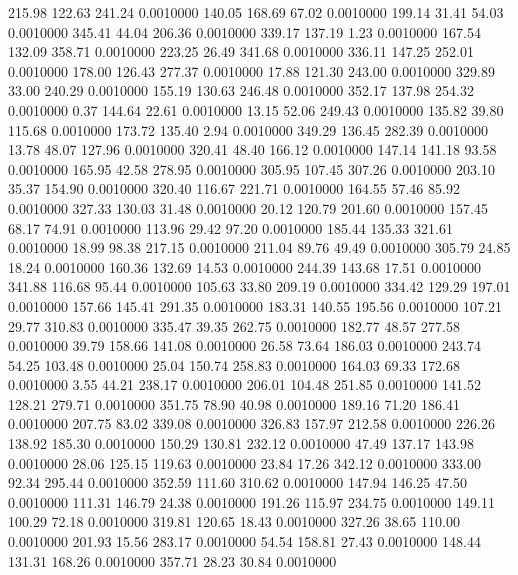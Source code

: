  215.98  122.63  241.24   0.0010000
 140.05  168.69   67.02   0.0010000
 199.14   31.41   54.03   0.0010000
 345.41   44.04  206.36   0.0010000
 339.17  137.19    1.23   0.0010000
 167.54  132.09  358.71   0.0010000
 223.25   26.49  341.68   0.0010000
 336.11  147.25  252.01   0.0010000
 178.00  126.43  277.37   0.0010000
  17.88  121.30  243.00   0.0010000
 329.89   33.00  240.29   0.0010000
 155.19  130.63  246.48   0.0010000
 352.17  137.98  254.32   0.0010000
   0.37  144.64   22.61   0.0010000
  13.15   52.06  249.43   0.0010000
 135.82   39.80  115.68   0.0010000
 173.72  135.40    2.94   0.0010000
 349.29  136.45  282.39   0.0010000
  13.78   48.07  127.96   0.0010000
 320.41   48.40  166.12   0.0010000
 147.14  141.18   93.58   0.0010000
 165.95   42.58  278.95   0.0010000
 305.95  107.45  307.26   0.0010000
 203.10   35.37  154.90   0.0010000
 320.40  116.67  221.71   0.0010000
 164.55   57.46   85.92   0.0010000
 327.33  130.03   31.48   0.0010000
  20.12  120.79  201.60   0.0010000
 157.45   68.17   74.91   0.0010000
 113.96   29.42   97.20   0.0010000
 185.44  135.33  321.61   0.0010000
  18.99   98.38  217.15   0.0010000
 211.04   89.76   49.49   0.0010000
 305.79   24.85   18.24   0.0010000
 160.36  132.69   14.53   0.0010000
 244.39  143.68   17.51   0.0010000
 341.88  116.68   95.44   0.0010000
 105.63   33.80  209.19   0.0010000
 334.42  129.29  197.01   0.0010000
 157.66  145.41  291.35   0.0010000
 183.31  140.55  195.56   0.0010000
 107.21   29.77  310.83   0.0010000
 335.47   39.35  262.75   0.0010000
 182.77   48.57  277.58   0.0010000
  39.79  158.66  141.08   0.0010000
  26.58   73.64  186.03   0.0010000
 243.74   54.25  103.48   0.0010000
  25.04  150.74  258.83   0.0010000
 164.03   69.33  172.68   0.0010000
   3.55   44.21  238.17   0.0010000
 206.01  104.48  251.85   0.0010000
 141.52  128.21  279.71   0.0010000
 351.75   78.90   40.98   0.0010000
 189.16   71.20  186.41   0.0010000
 207.75   83.02  339.08   0.0010000
 326.83  157.97  212.58   0.0010000
 226.26  138.92  185.30   0.0010000
 150.29  130.81  232.12   0.0010000
  47.49  137.17  143.98   0.0010000
  28.06  125.15  119.63   0.0010000
  23.84   17.26  342.12   0.0010000
 333.00   92.34  295.44   0.0010000
 352.59  111.60  310.62   0.0010000
 147.94  146.25   47.50   0.0010000
 111.31  146.79   24.38   0.0010000
 191.26  115.97  234.75   0.0010000
 149.11  100.29   72.18   0.0010000
 319.81  120.65   18.43   0.0010000
 327.26   38.65  110.00   0.0010000
 201.93   15.56  283.17   0.0010000
  54.54  158.81   27.43   0.0010000
 148.44  131.31  168.26   0.0010000
 357.71   28.23   30.84   0.0010000
